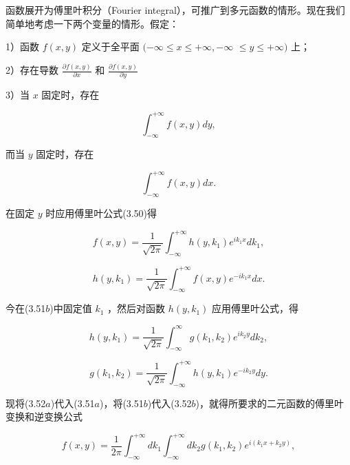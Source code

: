 函数展开为傅里叶积分（Fourier integral），可推广到多元函数的情形。现在我们简单地考虑一下两个变量的情形。假定：

1）函数 $f(x,y)$ 定义于全平面 $(-\infty \leqslant x\leqslant +\infty , - \infty$ $\leqslant y\leqslant +\infty)$ 上；

2）存在导数 $\frac{\partial f(x,y)}{\partial x}$ 和 $\frac{\partial f(x,y)}{\partial y}$

3）当 $x$ 固定时，存在

\begin{equation*}
\int_ {- \infty} ^ {+ \infty} f (x, y) d y,
\end{equation*}

而当 $y$ 固定时，存在

\begin{equation*}
\int_ {- \infty} ^ {+ \infty} f (x, y) d x.
\end{equation*}

在固定 $y$ 时应用傅里叶公式(3.50)得

\begin{equation*}
f (x, y) = \frac {1}{\sqrt {2 \pi}} \int_ {- \infty} ^ {+ \infty} h (y, k _ {1}) e ^ {i k _ {1} x} d k _ {1},\tag{3.51a}
\end{equation*}

\begin{equation*}
h (y, k _ {1}) = \frac {1}{\sqrt {2 \pi}} \int_ {- \infty} ^ {+ \infty} f (x, y) e ^ {- i k _ {1} x} d x.\tag{3.51b}
\end{equation*}

今在(3.51$b$)中固定值 $k_{1}$ ，然后对函数 $h(y, k_{1})$ 应用傅里叶公式，得

\begin{equation*}
h (y, k _ {1}) = \frac {1}{\sqrt {2 \pi}} \int_ {- \infty} ^ {\infty} g (k _ {1}, k _ {2}) e ^ {i k _ {2} y} d k _ {2},\tag{3.52a}
\end{equation*}

\begin{equation*}
g (k _ {1}, k _ {2}) = \frac {1}{\sqrt {2 \pi}} \int_ {- \infty} ^ {+ \infty} h (y, k _ {1}) e ^ {- i k _ {2} y} d y.\tag{3.52b}
\end{equation*}

现将(3.52$a$)代入(3.51$a$)，将(3.51$b$)代入(3.52$b$)，就得所要求的二元函数的傅里叶变换和逆变换公式

\begin{equation*}
f (x, y) = \frac {1}{2 \pi} \int_ {- \infty} ^ {+ \infty} d k _ {1} \int_ {- \infty} ^ {+ \infty} d k _ {2} g (k _ {1}, k _ {2}) e ^ {i (k _ {1} x + k _ {2} y)},\tag{3.53a}
\end{equation*}

